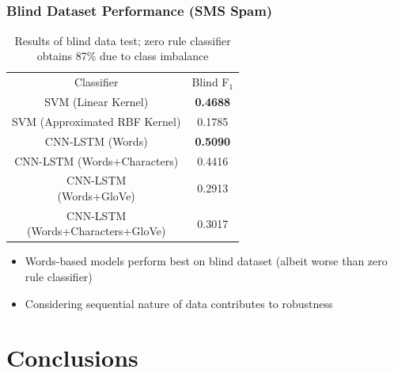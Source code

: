 \documentclass{beamer}
\begin{document}
\subsection{}
\begin{framefont}{\footnotesize}
	\begin{frame}
		\frametitle{Blind Dataset Performance (SMS Spam)}
		\begin{table}
			\centering
			\bgroup
			\def\arraystretch{1.5}
			\begin{tabular}{|c|c|} \hline
				Classifier & Blind F$_1$ \\ \hhline{|=|=|}
				SVM (Linear Kernel) & \textbf{0.4688}  \\ \hline
				SVM (Approximated RBF Kernel) & 0.1785 \\ \hline
				CNN-LSTM (Words) & \textbf{0.5090} \\ \hline
				CNN-LSTM (Words+Characters) & 0.4416 \\ \hline
				\makecell{CNN-LSTM \\(Words+GloVe)} & 0.2913  \\ \hline
				\makecell{CNN-LSTM \\(Words+Characters+GloVe)} & 0.3017  \\ \hline
			\end{tabular}
			\egroup
			\caption{Results of blind data test; zero rule classifier obtains 87\% due to class imbalance}
		\end{table}
		\vspace{-10pt}
		\begin{itemize}
			\item Words-based models perform best on blind dataset (albeit worse than zero rule classifier)
			\item Considering sequential nature of data contributes to robustness
		\end{itemize}
	\end{frame}
\end{framefont}

\section{Conclusions}
\end{document}
